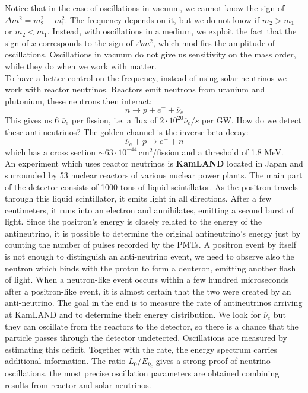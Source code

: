\documentclass[10.75pt,a4paper,openright,bottom=2cm]{article}
\begin{document}
Notice that in the case of oscillations in vacuum, we cannot know the sign of $\Delta m^2=m_2^2-m_1^2$. The frequency depends on it, but we do not know if $m_2>m_1$ or $m_2<m_1$. Instead, with oscillations in a medium, we exploit the fact that the sign of $x$ corresponds to the sign of $\Delta m^2$, which modifies the amplitude of oscillations. Oscillations in vacuum do not give us sensitivity on the mass order, while they do when we work with matter.\\
To have a better control on the frequency, instead of using solar neutrinos we work with reactor neutrinos. Reactors emit neutrons from uranium and plutonium, these neutrons then interact:
\[
n\to p+e^-+\overline{\nu}_e
\]
This gives us 6 $\overline{\nu}_e$ per fission, i.e. a flux of $2\cdot10^{20}\overline{\nu}_e/s$ per GW. How do we detect these anti-neutrinos? The golden channel is the inverse beta-decay:
\[
\overline{\nu}_e+p\to e^++n
\]
which has a cross section $\sim63\cdot10^{-44}$\,cm$^2$/fission and a threshold of 1.8 MeV.\\
An experiment which uses reactor neutrinos is \textbf{KamLAND} located in Japan and surrounded by 53 nuclear reactors of various nuclear power plants. The main part of the detector consists of 1000 tons of liquid scintillator. As the positron travels through this liquid scintillator, it emits light in all directions. After a few centimeters, it runs into an electron and annihilates, emitting a second burst of light. Since the positron's energy is closely related to the energy of the antineutrino, it is possible to determine the original antineutrino's energy just by counting the number of pulses recorded by the PMTs. A positron event by itself is not enough to distinguish an anti-neutrino event, we need to observe also the neutron which binds with the proton to form a deuteron, emitting another flash of light. When a neutron-like event occurs within a few hundred microseconds after a positron-like event, it is almost certain that the two were created by an anti-neutrino. The goal in the end is to measure the rate of antineutrinos arriving at KamLAND and to determine their energy distribution. We look for $\overline{\nu}_e$ but they can oscillate from the reactors to the detector, so there is a chance that the particle passes through the detector undetected. Oscillations are measured by estimating this deficit. Together with the rate, the energy spectrum carries additional information. The ratio $L_0/E_{\overline{\nu}_e}$ gives a strong proof of neutrino oscillations, the most precise oscillation parameters are obtained combining results from reactor and solar neutrinos.\\
\end{document}
